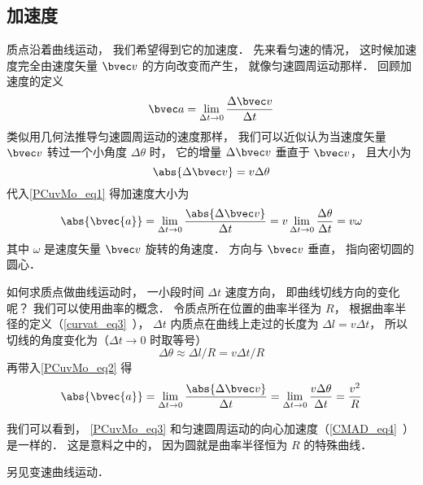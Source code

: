 


\subsection{加速度}
质点沿着曲线运动， 我们希望得到它的加速度． 先来看匀速的情况， 这时候加速度完全由速度矢量 $\bvec v$ 的方向改变而产生， 就像匀速圆周运动那样． 回顾加速度的定义
\begin{equation}\label{PCuvMo_eq2}
\bvec a = \lim_{\Delta t \to 0} \frac{\Delta \bvec v}{\Delta t}
\end{equation}
类似用几何法推导匀速圆周运动的速度那样， 我们可以近似认为当速度矢量 $\bvec v$ 转过一个小角度 $\Delta \theta$ 时， 它的增量 $\Delta \bvec v$ 垂直于 $\bvec v$， 且大小为
\begin{equation}\label{PCuvMo_eq1}
\abs{\Delta \bvec v} = v\Delta\theta
\end{equation}
代入\autoref{PCuvMo_eq1} 得加速度大小为
\begin{equation}
\abs{\bvec{a}} = \lim_{\Delta t \to 0} \frac{\abs{\Delta \bvec v}}{\Delta t}
= v\lim_{\Delta t \to 0}\frac{\Delta \theta}{\Delta t} = v\omega
\end{equation}
其中 $\omega$ 是速度矢量 $\bvec v$ 旋转的角速度． 方向与 $\bvec v$ 垂直， 指向密切圆的圆心．

如何求质点做曲线运动时， 一小段时间 $\Delta t$ 速度方向， 即曲线切线方向的变化呢？ 我们可以使用曲率的概念． 令质点所在位置的曲率半径为 $R$， 根据曲率半径的定义（\autoref{curvat_eq3}~）， $\Delta t$ 内质点在曲线上走过的长度为 $\Delta l = v \Delta t$， 所以切线的角度变化为（$\Delta t\to 0$ 时取等号）
\begin{equation}
\Delta \theta \approx \Delta l/R = v \Delta t/R
\end{equation}
 再带入\autoref{PCuvMo_eq2} 得
\begin{equation}\label{PCuvMo_eq3}
\abs{\bvec{a}} = \lim_{\Delta t \to 0} \frac{\abs{\Delta \bvec v}}{\Delta t}
= \lim_{\Delta t \to 0}  \frac{v\Delta\theta}{\Delta t} = \frac{v^2}{R}
\end{equation}


我们可以看到， \autoref{PCuvMo_eq3} 和匀速圆周运动的向心加速度（\autoref{CMAD_eq4}~）是一样的． 这是意料之中的， 因为圆就是曲率半径恒为 $R$ 的特殊曲线．

另见变速曲线运动．
